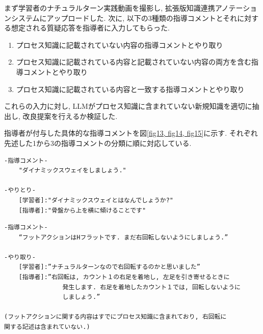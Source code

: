 まず学習者のナチュラルターン実践動画を撮影し, 拡張版知識連携アノテーションシステムにアップロードした. 次に, 以下の3種類の指導コメントとそれに対する想定される質疑応答を指導者に入力してもらった.

\begin{enumerate}
    \item プロセス知識に記載されていない内容の指導コメントとやり取り
    
    \item プロセス知識に記載されている内容と記載されていない内容の両方を含む指導コメントとやり取り
    
    \item プロセス知識に記載されている内容と一致する指導コメントとやり取り
    
\end{enumerate}

これらの入力に対し, LLMがプロセス知識に含まれていない新規知識を適切に抽出し, 改良提案を行えるか検証した. 

指導者が付与した具体的な指導コメントを図\ref{fig13, fig14, fig15}に示す. それぞれ先述した1から3の指導コメントの分類に順に対応している.


\begin{tcolorbox}[breakable, colback=white, colframe=black]
    \begin{verbatim}
-指導コメント- 
    "ダイナミックスウェイをしましょう."

-やりとり- 
    [学習者]:"ダイナミックスウェイとはなんでしょうか?" 
    [指導者]:"骨盤から上を横に傾けることです" 
    \end{verbatim}
\end{tcolorbox}
    
\label{fig13}




\begin{tcolorbox}[breakable, colback=white, colframe=black]
    \begin{verbatim}
-指導コメント-
    “フットアクションはHフラットです. まだ右回転しないようにしましょう.”

-やり取り-
    [学習者]:”ナチュラルターンなので右回転するのかと思いました”
    [指導者]:”右回転は, カウント１の右足を着地し, 左足を引き寄せるときに
                発生します. 右足を着地したカウント１では, 回転しないように
                しましょう.”

(フットアクションに関する内容はすでにプロセス知識に含まれており, 右回転に
関する記述は含まれていない.)
    \end{verbatim}
\end{tcolorbox}
    
